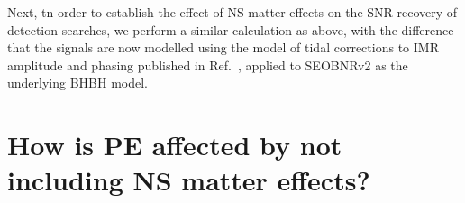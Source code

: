 \documentclass[aps,prd,amsmath,floats,floatfix, twocolumn,
superscriptaddress,nofootinbib,showpacs]{revtex4-1}
\begin{document}
Next, tn order to establish the effect of NS matter effects on the SNR recovery of 
detection searches, we perform a similar calculation as above, with the
difference that the signals are now modelled using the model of tidal 
corrections to IMR amplitude and phasing published in 
Ref.~\cite{Lackey:2013axa}, applied to SEOBNRv2 as the underlying BHBH model.




\section{How is PE affected by not including NS matter effects?}
\end{document}
